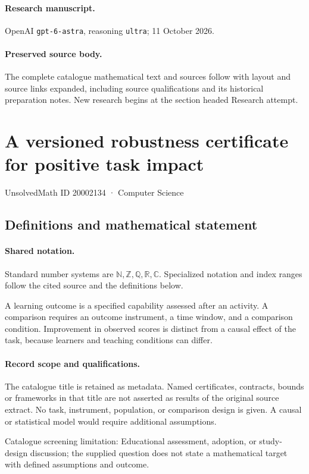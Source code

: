 \documentclass[11pt]{article}
\begin{document}
\paragraph{Research manuscript.} OpenAI \texttt{gpt-6-astra}, reasoning \texttt{ultra}; 11 October 2026.
\paragraph{Preserved source body.} The complete catalogue mathematical text and sources follow with layout and source links expanded, including source qualifications and its historical preparation notes. New research begins at the section headed Research attempt.

\section{A versioned robustness certificate for positive task impact}\label{20002134}
{\small UnsolvedMath ID 20002134 · Computer Science}
\subsection{Definitions and mathematical statement}

\paragraph{Shared notation.}Standard number systems are $\mathbb N,\mathbb Z,\mathbb Q,\mathbb R,\mathbb C$. Specialized notation and index ranges follow the cited source and the definitions below.


A learning outcome is a specified capability assessed after an activity. A comparison requires an outcome instrument, a time window, and a comparison condition. Improvement in observed scores is distinct from a causal effect of the task, because learners and teaching conditions can differ.
\paragraph{Record scope and qualifications.}
The catalogue title is retained as metadata. Named certificates, contracts, bounds or frameworks in that title are not asserted as results of the original source extract.
No task, instrument, population, or comparison design is given. A causal or statistical model would require additional assumptions.

Catalogue screening limitation: Educational assessment, adoption, or study-design discussion; the supplied question does not state a mathematical target with defined assumptions and outcome.
\end{document}
